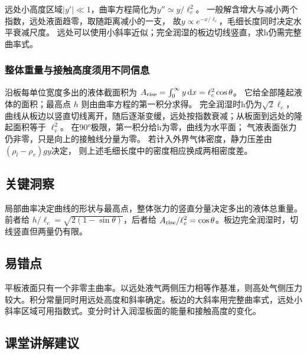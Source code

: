 \documentclass[UTF8,fontset=fandol,a4paper,11pt]{ctexart}
\newcommand{\dd}{\mathop{}\!\mathrm{d}}
\begin{document}
远处小高度区域$|y'|\ll1$，曲率方程简化为$y''\simeq y/\ell_c^2$。
一般解含增大与减小两个指数，远处液面趋零，取随距离减小的一支，
故$y\propto e^{-x/\ell_c}$，毛细长度同时决定水平衰减尺度。
远处可以使用小斜率近似；完全润湿的板边切线竖直，求h仍需完整曲率式。

\subsubsection*{整体重量与接触高度须用不同信息}
沿板每单位宽度多出的液体截面积为
$A_{\rm rise}=\int_0^\infty y\dd x=\ell_c^2\cos\theta$。
它给全部隆起液体的面积；最高点 $h$ 则由曲率方程的第一积分求得。
完全润湿时h仍为$\sqrt2\ell_c$，
曲线从板边以竖直切线离开，随后逐渐变缓，远处按指数衰减；从板面到远处的隆起面积等于 $\ell_c^2$。
在90°极限，第一积分给h为零，曲线为水平面；
气液表面张力仍非零，只是向上的接触线分量为零。
若计入外界气体密度，静力压差由$(\rho_l-\rho_v)gy$决定，
则上述毛细长度中的密度相应换成两相密度差。




\subsection*{关键洞察}

局部曲率决定曲线的形状与最高点，整体张力的竖直分量决定多出的液体总重量。前者给 $h/\ell_c=\sqrt{2(1-\sin\theta)}$，后者给 $A_{\rm rise}/\ell_c^2=\cos\theta$。板边完全润湿时，切线竖直但两量仍有限。



\subsection*{易错点}

平板液面只有一个非零主曲率。以远处液气两侧压力相等作基准，则高处气侧压力较大。积分常量同时用远处高度和斜率确定。板边的大斜率用完整曲率式，远处小斜率区域可用指数式。变分时计入润湿板面的能量和接触高度的变化。



\subsection*{课堂讲解建议}
\end{document}
